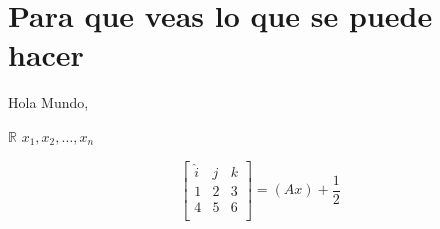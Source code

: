 \section{Para que veas lo que se puede hacer}
Hola Mundo, \cite{orimo2006reviewing}

\lipsum[2] \newline

$\mathbb{R}$
$x_1,x_2,\dots, x_n$

\begin{equation}
            \begin{bmatrix}
        \hat{i}&j&k\\
        1&2&3\\
4&5&6\\
    \end{bmatrix} = (Ax)+\frac{1}{2}
\end{equation}